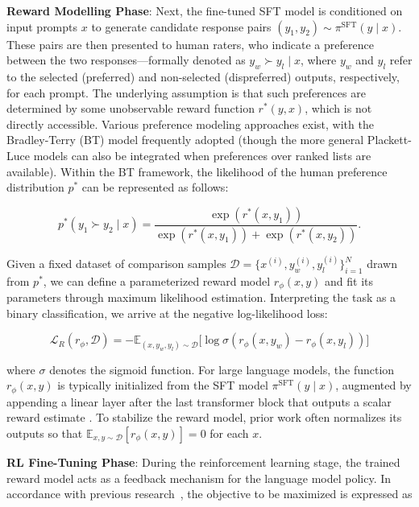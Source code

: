 \textbf{Reward Modelling Phase}: Next, the fine-tuned SFT model is conditioned on input prompts $x$ to generate candidate response pairs $(y_1, y_2)\sim \pi^\text{SFT}(y \mid x)$. These pairs are then presented to human raters, who indicate a preference between the two responses—formally denoted as $y_w\succ y_l \mid x$, where $y_w$ and $y_l$ refer to the selected (preferred) and non-selected (dispreferred) outputs, respectively, for each prompt. The underlying assumption is that such preferences are determined by some unobservable reward function $r^*(y, x)$, which is not directly accessible. Various preference modeling approaches exist, with the Bradley-Terry (BT) \cite{bradley1952rankanalysis} model frequently adopted (though the more general Plackett-Luce models \citep{plackett1975analysis, luce2012individual} can also be integrated when preferences over ranked lists are available). Within the BT framework, the likelihood of the human preference distribution $p^*$ can be represented as follows:

\begin{equation}\label{eq:bradley-terry}
    p^*(y_1\succ y_2 \mid x)=\frac{\exp\left(r^*(x, y_1)\right)}{\exp\left(r^*(x, y_1)\right) + \exp\left(r^*(x, y_2)\right)}.
\end{equation}

Given a fixed dataset of comparison samples $\mathcal{D}=\bigl\{x^{(i)}, y_w^{(i)}, y_l^{(i)}\bigr\}_{i=1}^N$ drawn from $p^*$, we can define a parameterized reward model $r_{\phi}(x, y)$ and fit its parameters through maximum likelihood estimation. Interpreting the task as a binary classification, we arrive at the negative log-likelihood loss:

\begin{equation}\label{eq:reward_model}
    \mathcal{L}_R(r_{\phi}, \mathcal{D}) = -\mathbb{E}_{(x, y_w, y_l)\sim \mathcal{D}}\bigl[\log \sigma(r_{\phi}(x, y_w)- r_{\phi}(x, y_l))\bigr]
\end{equation}

where $\sigma$ denotes the sigmoid function. For large language models, the function $r_{\phi}(x, y)$ is typically initialized from the SFT model $\pi^\text{SFT}(y \mid x)$, augmented by appending a linear layer after the last transformer block that outputs a scalar reward estimate \cite{ziegler2020finetuning}. To stabilize the reward model, prior work often normalizes its outputs so that $\mathbb{E}_{x,y\sim \mathcal{D}}\left[r_\phi(x, y)\right] = 0$ for each $x$.

\textbf{RL Fine-Tuning Phase}: During the reinforcement learning stage, the trained reward model acts as a feedback mechanism for the language model policy. In accordance with previous research~\citep{jaques2017sequence, jaques2020human}, the objective to be maximized is expressed as

